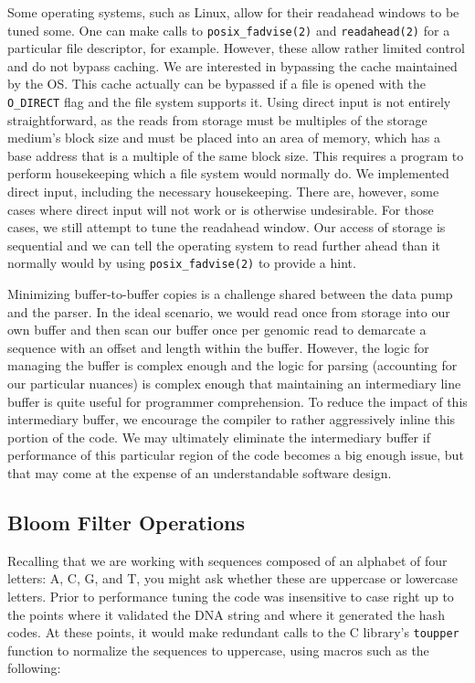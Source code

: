 Some operating systems, such as Linux, allow for their readahead windows to be
tuned some. One can make calls to \texttt{posix\_fadvise(2)} and
\texttt{readahead(2)} for a particular file descriptor, for example. However,
these allow rather limited control and do not bypass caching. We are interested
in bypassing the cache maintained by the OS. This cache actually can be
bypassed if a file is opened with the \texttt{O\_DIRECT} flag and the file
system supports it. Using direct input is not entirely straightforward, as the
reads from storage must be multiples of the storage medium's block size and
must be placed into an area of memory, which has a base address that is a
multiple of the same block size. This requires a program to perform
housekeeping which a file system would normally do. We implemented direct
input, including the necessary housekeeping. There are, however, some cases
where direct input will not work or is otherwise undesirable. For those cases,
we still attempt to tune the readahead window.  Our access of storage is
sequential and we can tell the operating system to read further ahead than it
normally would by using \texttt{posix\_fadvise(2)} to provide a hint.

Minimizing buffer-to-buffer copies is a challenge shared between the data pump
and the parser. In the ideal scenario, we would read once from storage into our
own buffer and then scan our buffer once per genomic read to demarcate a
sequence with an offset and length within the buffer. However, the logic for
managing the buffer is complex enough and the logic for parsing (accounting for
our particular nuances) is complex enough that maintaining an intermediary line
buffer is quite useful for programmer comprehension. To reduce the impact of
this intermediary buffer, we encourage the compiler to rather aggressively
inline this portion of the code. We may ultimately eliminate the intermediary
buffer if performance of this particular region of the code becomes a big
enough issue, but that may come at the expense of an understandable software
design.

\subsection{Bloom Filter Operations}

Recalling that we are working with sequences composed of an alphabet of four
letters: A, C, G, and T, you might ask whether these are uppercase or lowercase
letters. Prior to performance tuning the code was insensitive to case right up
to the points where it validated the DNA string and where it generated the hash
codes. At these points, it would make redundant calls to the C library's
\texttt{toupper} function to normalize the sequences to uppercase, using macros
such as the following:

